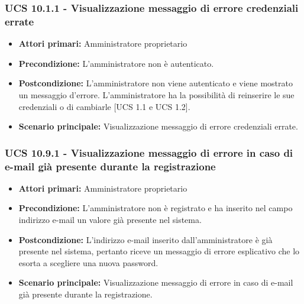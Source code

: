 \subsubsection{UCS 10.1.1 - Visualizzazione messaggio di errore credenziali errate}%
\begin{itemize}
\item \textbf{Attori primari:} Amministratore proprietario
\item \textbf{Precondizione:} L'amministratore non è autenticato.
\item \textbf{Postcondizione:} L'amministratore non viene autenticato e viene mostrato un messaggio d'errore. L'amministratore ha la possibilità di reinserire le sue credenziali o di cambiarle [UCS 1.1 e UCS 1.2].
\item \textbf{Scenario principale:} Visualizzazione messaggio di errore credenziali errate.
\end{itemize}

\subsubsection{UCS 10.9.1 - Visualizzazione messaggio di errore in caso di e-mail già presente durante la registrazione}%
\begin{itemize}
    \item \textbf{Attori primari:} Amministratore proprietario
    \item \textbf{Precondizione:} L'amministratore non è registrato e ha inserito nel campo indirizzo e-mail un valore già presente nel sistema.
    \item \textbf{Postcondizione:} L'indirizzo e-mail inserito dall'amministratore è già presente nel sistema, pertanto riceve un messaggio di errore esplicativo che lo esorta a scegliere una nuova password.
    \item \textbf{Scenario principale:} Visualizzazione messaggio di errore in caso di e-mail già presente durante la registrazione.
\end{itemize}

